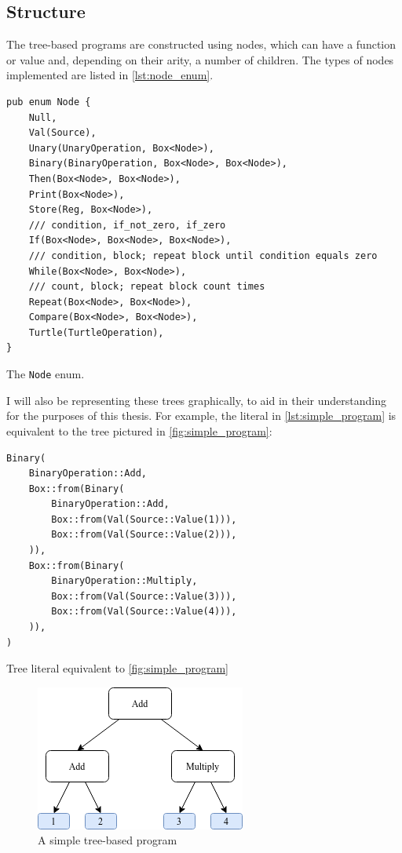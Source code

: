 \documentclass{report}
\newenvironment{code}{\captionsetup{type=listing}}{}
\begin{document}
\subsection{Structure}
The tree-based programs are constructed using nodes, which can have a function or value and, depending on their arity, a number of children. The types of nodes implemented are listed in \autoref{lst:node_enum}.

\begin{code}
    \begin{verbatim}
pub enum Node {
    Null,
    Val(Source),
    Unary(UnaryOperation, Box<Node>),
    Binary(BinaryOperation, Box<Node>, Box<Node>),
    Then(Box<Node>, Box<Node>),
    Print(Box<Node>),
    Store(Reg, Box<Node>),
    /// condition, if_not_zero, if_zero
    If(Box<Node>, Box<Node>, Box<Node>),
    /// condition, block; repeat block until condition equals zero
    While(Box<Node>, Box<Node>),
    /// count, block; repeat block count times
    Repeat(Box<Node>, Box<Node>),
    Compare(Box<Node>, Box<Node>),
    Turtle(TurtleOperation),
}
    \end{verbatim}
    \caption{The \texttt{Node} enum.}
    \label{lst:node_enum}
\end{code}

I will also be representing these trees graphically, to aid in their understanding for the purposes of this thesis. For example, the literal in \autoref{lst:simple_program} is equivalent to the tree pictured in \autoref{fig:simple_program}:

\begin{code}
    \begin{verbatim}
Binary(
    BinaryOperation::Add,
    Box::from(Binary(
        BinaryOperation::Add,
        Box::from(Val(Source::Value(1))),
        Box::from(Val(Source::Value(2))),
    )),
    Box::from(Binary(
        BinaryOperation::Multiply,
        Box::from(Val(Source::Value(3))),
        Box::from(Val(Source::Value(4))),
    )),
)
    \end{verbatim}
    \caption{Tree literal equivalent to \autoref{fig:simple_program}}
    \label{lst:simple_program}
\end{code}

\begin{figure}[ht]
    \centering
    \includegraphics[scale=0.75]{tree_1}
    \caption{A simple tree-based program}
    \label{fig:simple_program}
\end{figure}
\end{document}
